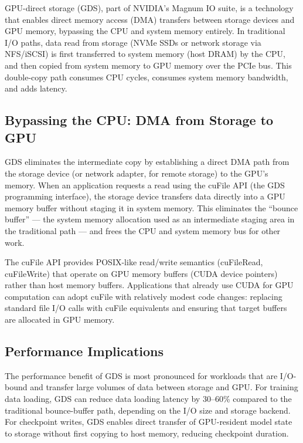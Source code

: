 GPU-direct storage (GDS), part of NVIDIA's Magnum IO suite, is a technology
that enables direct memory access (DMA) transfers between storage devices and
GPU memory, bypassing the CPU and system memory entirely. In traditional I/O
paths, data read from storage (NVMe SSDs or network storage via NFS/iSCSI) is
first transferred to system memory (host DRAM) by the CPU, and then copied
from system memory to GPU memory over the PCIe bus. This double-copy path
consumes CPU cycles, consumes system memory bandwidth, and adds latency.

\subsection{Bypassing the CPU: DMA from Storage to GPU}

GDS eliminates the intermediate copy by establishing a direct DMA path from
the storage device (or network adapter, for remote storage) to the GPU's
memory. When an application requests a read using the cuFile API (the GDS
programming interface), the storage device transfers data directly into a GPU
memory buffer without staging it in system memory. This eliminates the
``bounce buffer'' --- the system memory allocation used as an intermediate
staging area in the traditional path --- and frees the CPU and system memory
bus for other work.

The cuFile API provides POSIX-like read/write semantics (cuFileRead,
cuFileWrite) that operate on GPU memory buffers (CUDA device pointers) rather
than host memory buffers. Applications that already use CUDA for GPU
computation can adopt cuFile with relatively modest code changes: replacing
standard file I/O calls with cuFile equivalents and ensuring that target
buffers are allocated in GPU memory.

\subsection{Performance Implications}

The performance benefit of GDS is most pronounced for workloads that are
I/O-bound and transfer large volumes of data between storage and GPU. For
training data loading, GDS can reduce data loading latency by 30--60\%
compared to the traditional bounce-buffer path, depending on the I/O size and
storage backend. For checkpoint writes, GDS enables direct transfer of
GPU-resident model state to storage without first copying to host memory,
reducing checkpoint duration.


